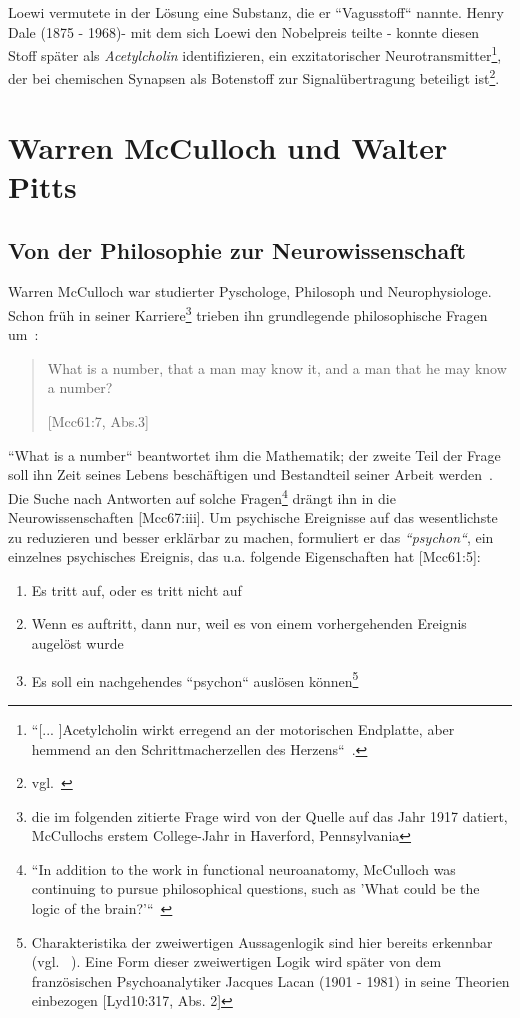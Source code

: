 Loewi vermutete in der Lösung eine Substanz, die er ``Vagusstoff`` nannte.
Henry Dale (1875 - 1968)- mit dem sich Loewi den Nobelpreis teilte - konnte diesen Stoff später als \textit{Acetylcholin} identifizieren, ein exzitatorischer Neurotransmitter\footnote{
    ``[... ]Acetylcholin wirkt erregend an der motorischen Endplatte, aber hemmend an den Schrittmacherzellen des Herzens``~\cite[105]{HS19b}.
}, der bei chemischen Synapsen als Botenstoff zur Signalübertragung beteiligt ist\footnote{
    vgl.~\cite[119, Exkurs 5.1]{BCP18}
}.

\section{Warren McCulloch und Walter Pitts}\label{appendix:mcculloch}
\subsection*{Von der Philosophie zur Neurowissenschaft}

Warren McCulloch war studierter Pyschologe, Philosoph und Neurophysiologe.
Schon früh in seiner Karriere\footnote{
    die im folgenden zitierte Frage wird von der Quelle auf das Jahr 1917 datiert, McCullochs erstem College-Jahr in Haverford, Pennsylvania
} trieben ihn grundlegende philosophische Fragen um~\cite[1]{Arb19}:

\blockquote[{[Mcc61:7, Abs.3]}]{
    What is a number, that a man may know it, and a man that he may know a number{?}
}

\noindent
``What is a number`` beantwortet ihm die Mathematik; der zweite Teil der Frage soll ihn Zeit seines Lebens beschäftigen und Bestandteil seiner Arbeit werden~\cite[4 f.]{Abr02}.
Die Suche nach Antworten auf solche Fragen\footnote{
    ``In addition to the work in functional neuroanatomy, McCulloch was continuing to pursue philosophical questions, such as 'What could be the logic of the brain?'``~\cite[3]{Arb19}
} drängt ihn in die Neurowissenschaften [Mcc67:iii].
Um psychische Ereignisse auf das wesentlichste zu reduzieren und besser erklärbar zu machen, formuliert er das \textit{``psychon``}, ein einzelnes psychisches Ereignis, das u.a. folgende Eigenschaften hat [Mcc61:5]:

\begin{enumerate}
    \item Es tritt auf, oder es tritt nicht auf
    \item Wenn es auftritt, dann nur, weil es von einem vorhergehenden Ereignis augelöst wurde
    \item Es soll ein nachgehendes ``psychon`` auslösen können\footnote{
        Charakteristika der zweiwertigen Aussagenlogik sind hier bereits erkennbar (vgl. ~\cite[7]{Abr02}). Eine Form dieser zweiwertigen Logik wird später von dem französischen Psychoanalytiker Jacques Lacan (1901 - 1981) in seine Theorien einbezogen [Lyd10:317, Abs. 2]
    }
\end{enumerate}


